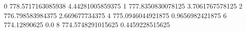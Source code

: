 0 778.5717163085938 4.44281005859375
1 777.8350830078125 3.7061767578125
2 776.798583984375 2.669677734375
4 775.0946044921875 0.9656982421875
6 774.12890625 0.0
8 774.5748291015625 0.4459228515625
